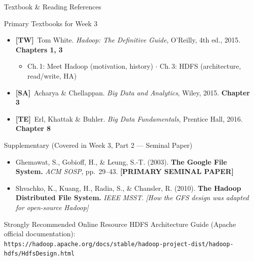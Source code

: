 \documentclass[aspectratio=169,10pt]{beamer}
\begin{document}
\begin{frame}{Textbook \& Reading References}
  \begin{block}{Primary Textbooks for Week 3}
    \begin{itemize}
      \item \textbf{[TW]}\ Tom White. \textit{Hadoop: The Definitive Guide}, O'Reilly, 4th ed., 2015.
            \hfill \textbf{Chapters 1, 3}
            \begin{itemize}
              \small\item Ch.\,1: Meet Hadoop (motivation, history) $\cdot$ Ch.\,3: HDFS (architecture, read/write, HA)
            \end{itemize}
      \item \textbf{[SA]}\ Acharya \& Chellappan. \textit{Big Data and Analytics}, Wiley, 2015.
            \hfill \textbf{Chapter 3}
      \item \textbf{[TE]}\ Erl, Khattak \& Buhler. \textit{Big Data Fundamentals}, Prentice Hall, 2016.
            \hfill \textbf{Chapter 8}
    \end{itemize}
  \end{block}
  \vspace{6pt}
  \begin{exampleblock}{Supplementary (Covered in Week 3, Part 2 — Seminal Paper)}
    \begin{itemize}
      \small
      \item Ghemawat, S., Gobioff, H., \& Leung, S.-T. (2003). \textbf{The Google File System.}
            \textit{ACM SOSP}, pp.\ 29--43. \textbf{[PRIMARY SEMINAL PAPER]}
      \item Shvachko, K., Kuang, H., Radia, S., \& Chansler, R. (2010). \textbf{The Hadoop Distributed File System.}
            \textit{IEEE MSST}. \textit{[How the GFS design was adapted for open-source Hadoop]}
    \end{itemize}
  \end{exampleblock}
  \vspace{4pt}
  \begin{alertblock}{Strongly Recommended Online Resource}
    \small HDFS Architecture Guide (Apache official documentation):\\
    \texttt{https://hadoop.apache.org/docs/stable/hadoop-project-dist/hadoop-hdfs/HdfsDesign.html}
  \end{alertblock}
\end{frame}
\end{document}
